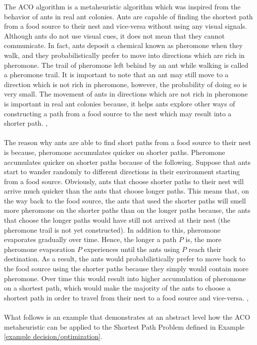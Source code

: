 \documentclass[12pt]{article}
\numberwithin{equation}{subsection}
\numberwithin{table}{subsection}
\numberwithin{algorithm}{subsection}
\begin{document}
The ACO algorithm is a metaheuristic algorithm which was inspired from the behavior of ants in real ant colonies. Ants are capable of finding the shortest path from a food source to their nest and vice-versa without using any visual signals. Although ants do not use visual cues, it does not mean that they cannot communicate. In fact, ants deposit a chemical known as pheromone when they walk, and they probabilistically prefer to move into directions which are rich in pheromone. The trail of pheromone left behind by an ant while walking is called a pheromone trail. It is important to note that an ant may still move to a direction which is not rich in pheromone, however, the probability of doing so is very small. The movement of ants in directions which are not rich in pheromone is important in real ant colonies because, it helps ants explore other ways of constructing a path from a food source to the nest which may result into a shorter path. \cite{dorigo_gambardella_1997}, \cite{dorigo_stutzle_thomas_2004}\\\\ 
The reason why ants are able to find short paths from a food source to their nest is because, pheromone accumulates quicker on shorter paths. Pheromone accumulates quicker on shorter paths because of the following. Suppose that ants start to wander randomly to different directions in their environment starting from a food source. Obviously, ants that choose shorter paths to their nest will arrive much quicker than the ants that choose longer paths. This means that, on the way back to the food source, the ants that used the shorter paths will smell more pheromone on the shorter paths than on the longer paths because, the ants that choose the longer paths would have still not arrived at their nest (the pheromone trail is not yet constructed). In addition to this, pheromone evaporates gradually over time. Hence, the longer a path $P$ is, the more pheromone evaporation $P$ experiences until the ants using $P$ reach their destination. As a result, the ants would probabilistically prefer to move back to the food source using the shorter paths because they simply would contain more pheromone. Over time this would result into higher accumulation of pheromone on a shortest path, which would make the majority of the ants to choose a shortest path in order to travel from their nest to a food source and vice-versa. \cite{dorigo_gambardella_1997}, \cite{dorigo_stutzle_thomas_2004}\\\\
What follows is an example that demonstrates at an abstract level how the ACO metaheuristic can be applied to the Shortest Path Problem defined in Example \ref{example decision/optimization}.
\end{document}
